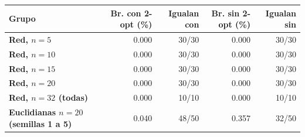 \renewcommand{\arraystretch}{1.2}
\begin{tabular}{|l|r|r|r|r|}
\hline
\rowcolor{gray!20} \textbf{Grupo} & \textbf{Br. con 2-opt (\%)} & \textbf{Igualan con} & \textbf{Br. sin 2-opt (\%)} & \textbf{Igualan sin} \\
\hline
\textbf{Red, $n=5$} & 0.000 & 30/30 & 0.000 & 30/30 \\
\hline
\textbf{Red, $n=10$} & 0.000 & 30/30 & 0.000 & 30/30 \\
\hline
\textbf{Red, $n=15$} & 0.000 & 30/30 & 0.000 & 30/30 \\
\hline
\textbf{Red, $n=20$} & 0.000 & 30/30 & 0.000 & 30/30 \\
\hline
\textbf{Red, $n=32$ (todas)} & 0.000 & 10/10 & 0.000 & 10/10 \\
\hline
\textbf{Euclidianas $n=20$ (semillas 1 a 5)} & 0.040 & 48/50 & 0.357 & 32/50 \\
\hline
\end{tabular}
